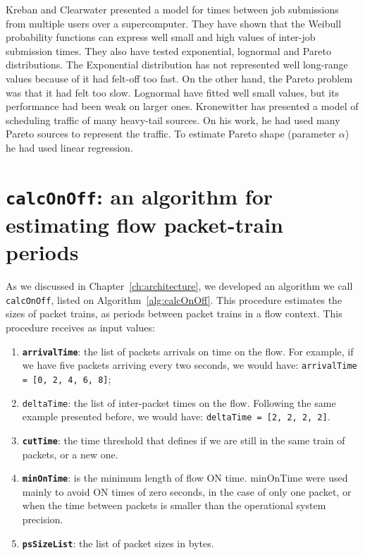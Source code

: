 Kreban and Clearwater\cite{hierarchical-dynamics-interarrival-times}  presented a model for times between job submissions from multiple users over a supercomputer. They have shown that the Weibull probability functions can express well small and high values of inter-job submission times. They also have tested exponential, lognormal and Pareto distributions. The Exponential distribution has not represented well long-range values because of it had felt-off too fast. On the other hand, the Pareto problem was that it had felt too slow. Lognormal have fitted well small values, but its performance had been weak on larger ones. Kronewitter\cite{optimal-scheduling-of-heavy-tailed-traffic} has presented a model of scheduling traffic of many heavy-tail sources. On his work, he had used many Pareto sources to represent the traffic. To estimate Pareto shape (parameter $\alpha$) he had used linear regression.



\section{\texttt{calcOnOff}: an algorithm for estimating flow packet-train periods}


As we discussed in Chapter~\ref{ch:architecture},  we developed an algorithm we call \texttt{calcOnOff}, listed on Algorithm~\ref{alg:calcOnOff}. This procedure estimates the sizes of packet trains, as periods between packet trains in a flow context. 
This procedure receives as input values:

\begin{enumerate}
\item  \textbf{\texttt{arrivalTime}}: the list of packets arrivals on time on the flow. For example, if we have five packets arriving every two seconds, we would have: \texttt{arrivalTime = [0, 2, 4,  6, 8]};
\item  \texttt{deltaTime}: the list of inter-packet times on the flow. Following the same example presented before, we would have: \texttt{deltaTime = [2, 2, 2, 2]}. 
\item  \textbf{\texttt{cutTime}}: the time threshold that defines if we are still in the same train of packets, or a new one. 
\item  \textbf{\texttt{minOnTime}}: is the minimum length of flow ON time. minOnTime were used mainly to avoid ON times of zero seconds, in the case of only one packet, or when the time between packets is smaller than the operational system precision. 
\item  \textbf{\texttt{psSizeList}}: the list of packet sizes in bytes. 
\end{enumerate}


